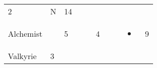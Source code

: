 \documentclass[12pt]{article}
\newcommand{\indexClass}[1]{\index{#1}}
\newcommand{\class}[1]{#1\indexClass{#1}}
\begin{document}
\begin{longtable}[]{@{}llllllllll@{}}
\begin{minipage}[t]{0.06\columnwidth}
2
\strut\end{minipage} &
\begin{minipage}[t]{0.07\columnwidth}\raggedright\strut
N
\strut\end{minipage} &
\begin{minipage}[t]{0.08\columnwidth}\raggedright\strut
14
\strut\end{minipage}\tabularnewline
\begin{minipage}[t]{0.13\columnwidth}\raggedright\strut
\class{Alchemist}
\strut\end{minipage} &
\begin{minipage}[t]{0.06\columnwidth}\raggedright\strut
\strut\end{minipage} &
\begin{minipage}[t]{0.06\columnwidth}\raggedright\strut
5
\strut\end{minipage} &
\begin{minipage}[t]{0.06\columnwidth}\raggedright\strut
\strut\end{minipage} &
\begin{minipage}[t]{0.06\columnwidth}\raggedright\strut
\strut\end{minipage} &
\begin{minipage}[t]{0.06\columnwidth}\raggedright\strut
4
\strut\end{minipage} &
\begin{minipage}[t]{0.06\columnwidth}\raggedright\strut
\strut\end{minipage} &
\begin{minipage}[t]{0.06\columnwidth}\raggedright\strut
\strut\end{minipage} &
\begin{minipage}[t]{0.07\columnwidth}\raggedright\strut
\begin{itemize}
\item
\end{itemize}
\strut\end{minipage} &
\begin{minipage}[t]{0.08\columnwidth}\raggedright\strut
9
\strut\end{minipage}\tabularnewline
\begin{minipage}[t]{0.13\columnwidth}\raggedright\strut
\class{Valkyrie}
\strut\end{minipage} &
\begin{minipage}[t]{0.06\columnwidth}\raggedright\strut
3
\strut\end{minipage} &
\begin{minipage}[t]{0.06\columnwidth}\raggedright\strut

\end{minipage}
\end{longtable}
\end{document}
